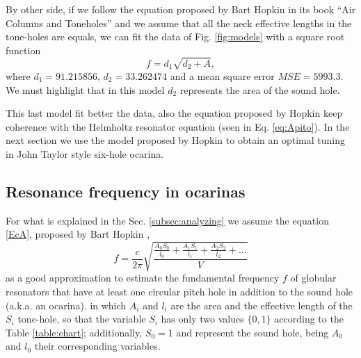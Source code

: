 \documentclass[11pt,twocolumn]{article}
\begin{document}
By other side, 
if we follow the equation proposed by Bart Hopkin in its book ``Air Columns and Toneholes'' 
\cite[pp. 44]{cabreraestudio} \cite{1999air} and we assume that all the neck effective lengths in the tone-holes are equals,
we can fit the data of Fig. \ref{fig:models} with a square root function
\begin{equation}
f=d_1\sqrt{d_2+A},
\end{equation}
where $d_1=91.215856$, $d_2=33.262474$ and a mean square error $MSE=5993.3$.
We must highlight that in this model $d_2$ represents the area of the sound hole. 

This last model fit better the data, 
also the equation proposed by Hopkin keep coherence with the Helmholtz resonator equation (seen in Eq. \ref{eq:Apito}).
In the next section we use the model proposed by Hopkin to obtain an optimal tuning in 
John Taylor style six-hole ocarina.


\subsection{Resonance frequency in ocarinas}
\label{subsec:Resonance}
For what is explained in the Sec. \ref{subsec:analyzing} 
we assume the equation \ref{EcA}, proposed by Bart Hopkin \cite[pp. 44]{cabreraestudio} \cite{1999air},
\begin{equation} \label{EcA}
 f = \frac{c}{2 \pi} \sqrt{\frac{\frac{A_{0}S_{0}}{l_{0}}+\frac{A_{1}S_{1}}{l_{1}}+\frac{A_{2}S_{2}}{l_{2}}+ . . .}{V} }   
\end{equation}
as a good approximation to estimate the fundamental frequency $f$ 
of globular resonators that have at least one circular pitch hole in addition to the sound hole (a.k.a. an ocarina). 
in which $A_i$ and $l_i$ are the area and the effective length of the $S_i$ tone-hole, 
so that the variable $S_i$ has only two values $\{0,1\}$ according to the Table \ref{table:chart}; 
additionally, $S_0=1$ and represent the sound hole, being $A_0$ and $l_0$ their corresponding variables. 
\end{document}
